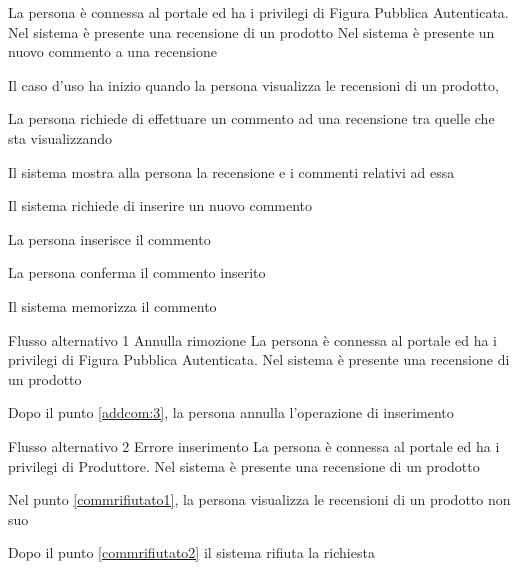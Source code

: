 {}
{La persona è connessa al portale ed ha i privilegi di Figura Pubblica Autenticata. Nel sistema è presente una recensione di un prodotto}
{Nel sistema è presente un nuovo commento a una recensione}
{\begin{enumCU}
	\item Il caso d'uso ha inizio quando la persona visualizza le recensioni di un prodotto, \label{commrifiutato1}
	\item La persona richiede di effettuare un commento ad una recensione tra quelle che sta visualizzando\label{commrifiutato2}
	\item Il sistema mostra alla persona la recensione e i commenti relativi ad essa
	\item Il sistema richiede di inserire un nuovo commento 
	\item La persona inserisce il commento\label{addcom:3}
	\item La persona conferma il commento inserito
	\item Il sistema memorizza il commento
\end{enumCU}}
%
{Flusso alternativo 1}%
{Annulla rimozione}%
{La persona è connessa al portale ed ha i privilegi di Figura Pubblica Autenticata. Nel sistema è presente una recensione di un prodotto}
{\postNulle}%
{\begin{enumCU}
		\item Dopo il punto \ref{addcom:3}, la persona annulla l'operazione di inserimento
	\end{enumCU}}%
%
{Flusso alternativo 2}%
{Errore inserimento}%
{La persona è connessa al portale ed ha i privilegi di Produttore. Nel sistema è presente una recensione di un prodotto}
{\postNulle}%
{\begin{enumCU}
		\item Nel punto \ref{commrifiutato1}, la persona visualizza le recensioni di un prodotto non suo
		\item Dopo il punto \ref{commrifiutato2} il sistema rifiuta la richiesta
	\end{enumCU}}%


